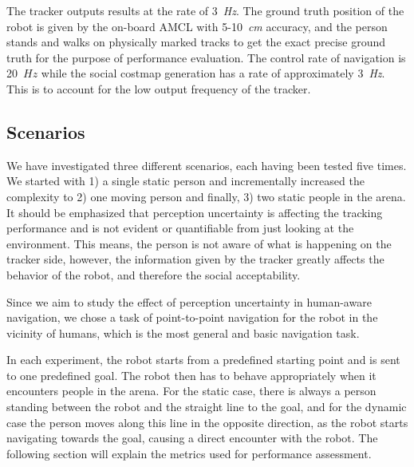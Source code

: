 The tracker outputs results at the rate of 3~\textit{Hz}. The ground truth position of the robot is given by the on-board AMCL with 5-10~\textit{cm} accuracy, and the person stands and walks on physically marked tracks to get the exact precise ground truth for the purpose of performance evaluation.
The control rate of navigation is 20~$Hz$ while the social costmap generation has a rate of approximately 3~\textit{Hz}. This is to account for the low output frequency of the tracker.


\subsection{Scenarios}
\label{sec:scenarios}

We have investigated three different scenarios, each having been tested five times. We started with 1) a single static person and incrementally increased the complexity to 2) one moving person and finally, 3) two static people in the arena. It should be emphasized that perception uncertainty is affecting the tracking performance and is not evident or quantifiable from just looking at the environment. This means, the person is not aware of what is happening on the tracker side, however, the information given by the tracker greatly affects the behavior of the robot, and therefore the social acceptability. 


Since we aim to study the effect of perception uncertainty in human-aware navigation, we chose a task of point-to-point navigation for the robot in the vicinity of humans, which is the most general and basic navigation task.


In each experiment, the robot starts from a predefined starting point and is sent to one predefined goal. The robot then has to behave appropriately when it encounters people in the arena. For the static case, there is always a person standing between the robot and the straight line to the goal, and for the dynamic case the person moves along this line in the opposite direction, as the robot starts navigating towards the goal, causing a direct encounter with the robot. The following section will explain the metrics used for performance assessment.%

